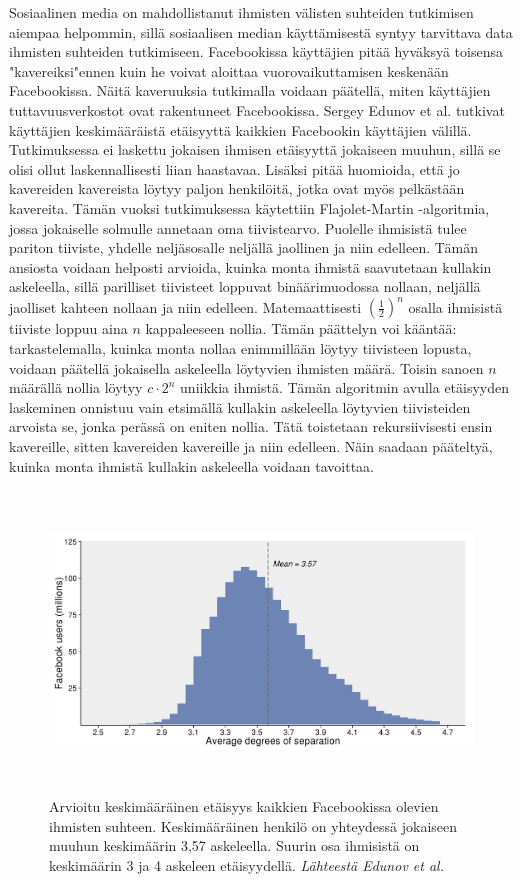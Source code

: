 \documentclass[finnish,12pt,a4paper,pdftex,elec,utf8]{aaltothesis}
\begin{document}
Sosiaalinen media on mahdollistanut ihmisten välisten suhteiden tutkimisen aiempaa helpommin, sillä sosiaalisen median käyttämisestä syntyy tarvittava data ihmisten suhteiden tutkimiseen. Facebookissa käyttäjien pitää hyväksyä toisensa "kavereiksi"\space ennen kuin he voivat aloittaa vuorovaikuttamisen keskenään Facebookissa. Näitä kaveruuksia tutkimalla voidaan päätellä, miten käyttäjien tuttavuusverkostot ovat rakentuneet Facebookissa. Sergey Edunov et al. tutkivat \cite{Three-and-half} käyttäjien keskimääräistä etäisyyttä kaikkien Facebookin käyttäjien välillä. Tutkimuksessa ei laskettu jokaisen ihmisen etäisyyttä jokaiseen muuhun, sillä se olisi ollut laskennallisesti liian haastavaa. Lisäksi pitää huomioida, että jo kavereiden kavereista löytyy paljon henkilöitä, jotka ovat myös pelkästään kavereita. Tämän vuoksi tutkimuksessa käytettiin Flajolet-Martin -algoritmia, jossa jokaiselle solmulle annetaan oma tiivistearvo. Puolelle ihmisistä tulee pariton tiiviste, yhdelle neljäsosalle neljällä jaollinen ja niin edelleen. Tämän ansiosta voidaan helposti arvioida, kuinka monta ihmistä saavutetaan kullakin askeleella, sillä parilliset tiivisteet loppuvat binäärimuodossa nollaan, neljällä jaolliset kahteen nollaan ja niin edelleen. Matemaattisesti $(\frac{1}{2})^n$ osalla ihmisistä tiiviste loppuu aina $n$ kappaleeseen nollia. Tämän päättelyn voi kääntää: tarkastelemalla, kuinka monta nollaa enimmillään löytyy tiivisteen lopusta, voidaan päätellä jokaisella askeleella löytyvien ihmisten määrä. Toisin sanoen $n$ määrällä nollia löytyy $c \cdot 2^n$ uniikkia ihmistä. Tämän algoritmin avulla etäisyyden laskeminen onnistuu vain etsimällä kullakin askeleella löytyvien tiivisteiden arvoista se, jonka perässä on eniten nollia. Tätä toistetaan rekursiivisesti ensin kavereille, sitten kavereiden kavereille ja niin edelleen. Näin saadaan pääteltyä, kuinka monta ihmistä kullakin askeleella voidaan tavoittaa.

\begin{figure}[htb]
\centering \includegraphics[height=8cm]{Kuva_Facebook_1}
\caption{Arvioitu keskimääräinen etäisyys kaikkien Facebookissa olevien ihmisten suhteen. Keskimääräinen henkilö on yhteydessä jokaiseen muuhun keskimäärin 3,57 askeleella. Suurin osa ihmisistä on keskimäärin 3 ja 4 askeleen etäisyydellä. \textit{Lähteestä Edunov et al. \cite{Three-and-half} \label{fig:Facebook_1}}}
\end{figure}
\end{document}
